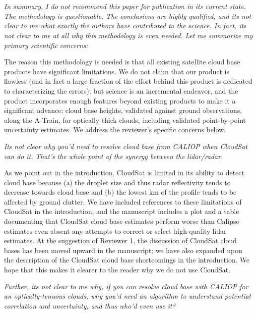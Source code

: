 \documentclass[12pt,a4paper]{responses}
\begin{document}
\section{}

\textit{In summary, I do not recommend this paper for publication in its current state.  The
methodology is questionable. The conclusions are highly qualified, and its not clear to
me what exactly the authors have contributed to the science. In fact, its not clear to me
at all why this methodology is even needed.  Let me summarize my primary scientific
concerns:}

The reason this methodology is needed is that all existing satellite cloud base
products have significant limitations.  We do not claim that our product is
flawless (and in fact a large fraction of the effort behind this product is
dedicated to characterizing the errors); but science is an incremental endeavor,
and the product incorporates enough features beyond existing products to make it
a significant advance: cloud base heights, validated against ground
observations, along the A-Train, for optically thick clouds, including validated
point-by-point uncertainty estimates.  We address the reviewer's specific
concerns below.

\textit{Its not clear why you’d need to resolve cloud base from CALIOP when CloudSat can
do it. That’s the whole point of the synergy between the lidar/radar.} 


As we point out in the introduction, CloudSat is limited in its ability to
detect cloud base because (a) the droplet size and thus radar reflectivity tends
to decrease towards cloud base and (b) the lowest km of the profile tends to be
affected by ground clutter.  We have included references to these
limitations of CloudSat in the introduction, and the manuscript includes a plot
and a table documenting that CloudSat cloud base estimates perform worse than
Calipso estimates even absent any attempts to correct or select high-quality
lidar estimates.  At the suggestion of Reviewer 1, the discussion of CloudSat
cloud bases has been moved upward in the manuscript; we have also expanded upon
the description of the CloudSat cloud base shortcomings in the introduction.  We
hope that this makes it clearer to the reader why we do not use CloudSat.

\textit{Further, its not clear to me why, if you can resolve cloud base with
  CALIOP for an optically-tenuous clouds, why you’d need an algorithm to
  understand potential correlation and uncertainty, and thus who’d even use it?}
\end{document}
